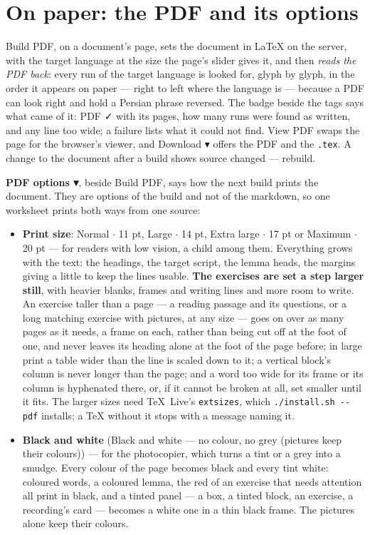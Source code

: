 \documentclass[11pt,oneside]{report}
\newcommand{\sym}[1]{{\symfont #1}}
\newcommand{\file}[1]{\texttt{#1}}
\newcommand{\menu}[1]{\textsf{#1}}
\begin{document}
\section{On paper: the PDF and its options}
\label{sec:studiopdf}

\menu{Build PDF}, on a document's page, sets the document in \LaTeX{} on the
server, with the target language at the size the page's slider gives it,
and then \emph{reads the PDF back}: every run of the target language is
looked for, glyph by glyph, in the order it appears on paper --- right to
left where the language is --- because a PDF can look right and hold a
Persian phrase reversed. The badge beside the tags says what came of it:
\menu{PDF \sym{✓}} with its pages, how many runs were found as written, and
any line too wide; a failure lists what it could not find. \menu{View PDF}
swaps the page for the browser's viewer, and \menu{Download \sym{▾}} offers
the PDF and the \file{.tex}. A change to the document after a build shows
\menu{source changed --- rebuild}.

\textbf{\menu{PDF options \sym{▾}}}, beside \menu{Build PDF}, says how the
next build prints the document. They are options of the build and not of the
markdown, so one worksheet prints both ways from one source:

\begin{itemize}
\item \textbf{Print size}: \menu{Normal $\cdot$ 11 pt}, \menu{Large $\cdot$
  14 pt}, \menu{Extra large $\cdot$ 17 pt} or \menu{Maximum $\cdot$ 20 pt} ---
  for readers with low vision, a child among them. Everything grows with the
  text: the headings, the target script, the lemma heads, the margins giving
  a little to keep the lines usable. \textbf{The exercises are set a step
  larger still}, with heavier blanks, frames and writing lines and more room
  to write. An exercise taller than a page --- a reading passage and its
  questions, or a long matching exercise with pictures, at any size ---
  goes on over as many pages as it needs, a frame on each, rather than being
  cut off at the foot of one, and never leaves its heading alone at the foot
  of the page before; in large print a table
  wider than the line is scaled down to it; a vertical block's column is
  never longer than the page; and a word too wide for its frame or its column
  is hyphenated there, or, if it cannot be broken at all, set smaller until
  it fits. The larger sizes need \TeX~Live's \texttt{extsizes}, which
  \texttt{./install.sh -{}-pdf} installs; a \TeX{} without it stops with a
  message naming it.
\item \textbf{Black and white} (\menu{Black and white --- no colour, no grey
  (pictures keep their colours)}) --- for the photocopier, which turns a
  tint or a grey into a smudge. Every colour of the page becomes black and
  every tint white: coloured words, a coloured lemma, the red of an exercise
  that needs attention all print in black, and a tinted panel --- a box, a
  tinted block, an exercise, a recording's card --- becomes a white one in a
  thin black frame. The pictures alone keep their colours.
\end{itemize}
\end{document}
